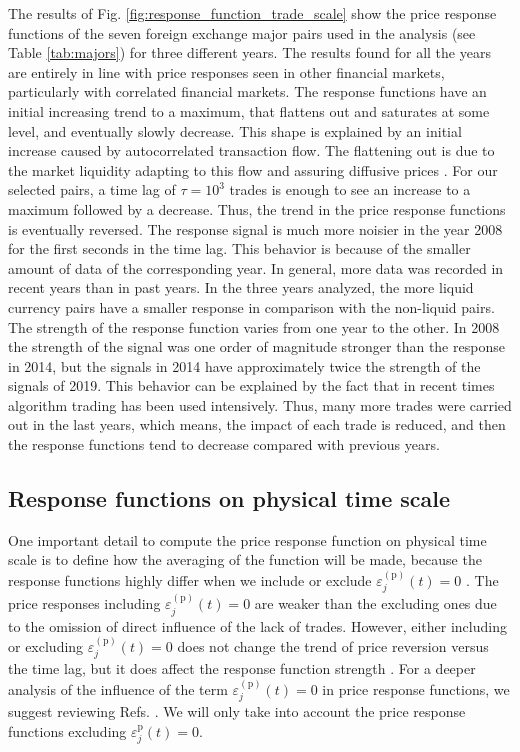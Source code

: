 The results of Fig. \ref{fig:response_function_trade_scale} show the
price response functions of the seven foreign exchange major pairs used in the
analysis (see Table \ref{tab:majors}) for three different years. The results
found for all the years are entirely in line with price responses seen in other
financial markets, particularly with correlated financial markets. The response
functions have an initial increasing trend to a maximum, that flattens out and
saturates at some level, and eventually slowly decrease. This shape is
explained by an initial increase caused by autocorrelated transaction flow. The
flattening out is due to the market liquidity adapting to this flow and assuring
diffusive prices \cite{EMH_lillo}. For our selected pairs, a time lag of
$\tau = 10^{3} $ trades is enough to see an increase to a maximum followed by a
decrease. Thus, the trend in the price response functions is eventually
reversed. The response signal is much more noisier in the year 2008 for the
first seconds in the time lag. This behavior is because of the smaller amount
of data of the corresponding year. In general, more data was recorded in recent
years than in past years. In the three years analyzed, the more liquid currency
pairs have a smaller response in comparison with the non-liquid pairs.  The
strength of the response function varies from one year to the other. In 2008
the strength of the signal was one order of magnitude stronger than the
response in 2014, but the signals in 2014 have approximately twice the strength
of the signals of 2019. This behavior can be explained by the fact that in
recent times algorithm trading has been used intensively. Thus, many more
trades were carried out in the last years, which means, the impact of each
trade is reduced, and then the response functions tend to decrease compared
with previous years.

\subsection{Response functions on physical time scale}
\label{subsec:response_function_physical}

One important detail to compute the price response function on physical time
scale is to define how the averaging of the function will be made, because the
response functions highly differ when we include or exclude
$\varepsilon^{\left(\textrm{p}\right)}_j \left( t\right) = 0$
\cite{Wang_2016_cross}. The price responses including
$\varepsilon^{\left(\textrm{p}\right)}_j \left( t\right) = 0$ are weaker than
the excluding ones due to the omission of direct influence of the lack of
trades. However, either including or excluding
$\varepsilon^{\left(\textrm{p}\right)}_j \left( t\right) = 0$ does not change
the trend of price reversion versus the time lag, but it does affect the
response function strength \cite{Wang_2016_avg}. For a deeper analysis of the
influence of the term
$\varepsilon^{\left(\textrm{p}\right)}_j \left( t\right) = 0$ in price response
functions, we suggest reviewing Refs. \cite{Wang_2016_avg,Wang_2016_cross}. We
will only take into account the price response functions excluding
$\varepsilon^{\textrm{p}}_j \left( t\right) = 0$.


